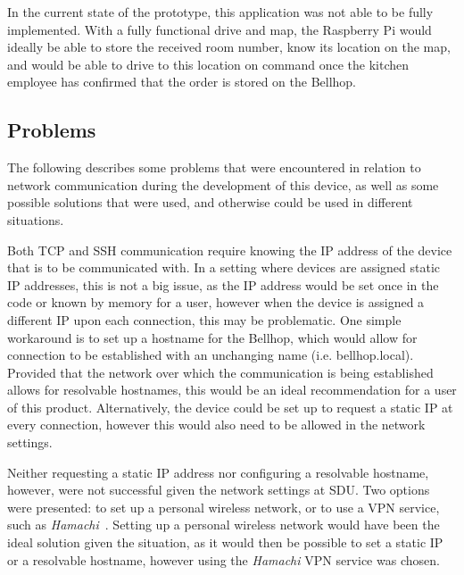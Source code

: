 \documentclass[11pt]{article}
\begin{document}
In the current state of the prototype, this application was not able to be fully implemented. With a fully functional drive and map, the Raspberry Pi would ideally be able to store the received room number, know its location on the map, and would be able to drive to this location on command once the kitchen employee has confirmed that the order is stored on the Bellhop.
\subsection*{Problems}
The following describes some problems that were encountered in relation to network communication during the development of this device, as well as some possible solutions that were used, and otherwise could be used in different situations.


Both TCP and SSH communication require knowing the IP address of the device that is to be communicated with. In a setting where devices are assigned static IP addresses, this is not a big issue, as the IP address would be set once in the code or known by memory for a user, however when the device is assigned a different IP upon each connection, this may be problematic. One simple workaround is to set up a hostname for the Bellhop, which would allow for connection to be established with an unchanging name (i.e. bellhop.local). Provided that the network over which the communication is being established allows for resolvable hostnames, this would be an ideal recommendation for a user of this product. Alternatively, the device could be set up to request a static IP at every connection, however this would also need to be allowed in the network settings.


Neither requesting a static IP address nor configuring a resolvable hostname, however, were not successful given the network settings at SDU. Two options were presented: to set up a personal wireless network, or to use a VPN service, such as \textit{Hamachi}~\cite{hamachi}. Setting up a personal wireless network would have been the ideal solution given the situation, as it would then be possible to set a static IP or a resolvable hostname, however using the \textit{Hamachi} VPN service was chosen.
\end{document}

